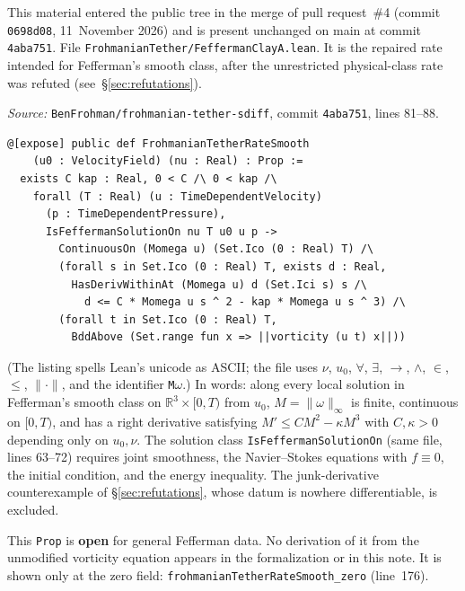 \documentclass[11pt]{article}
\theoremstyle{plain}
\theoremstyle{definition}
\theoremstyle{remark}
\newcommand{\R}{\mathbb{R}}
\begin{document}
This material entered the public tree in the merge of pull request~\#4 (commit \texttt{0698d08}, 11~November 2026) and is present unchanged on main at commit \texttt{4aba751}. File \texttt{FrohmanianTether/\hspace{0pt}FeffermanClayA.\hspace{0pt}lean}. It is the repaired rate intended for Fefferman's smooth class, after the unrestricted physical-class rate was refuted (see~\S\ref{sec:refutations}).

\textit{Source:} \texttt{BenFrohman/\hspace{0pt}frohmanian-tether-sdiff}, commit \texttt{4aba751}, lines 81--88.
\begin{lstlisting}
@[expose] public def FrohmanianTetherRateSmooth
    (u0 : VelocityField) (nu : Real) : Prop :=
  exists C kap : Real, 0 < C /\ 0 < kap /\
    forall (T : Real) (u : TimeDependentVelocity)
      (p : TimeDependentPressure),
      IsFeffermanSolutionOn nu T u0 u p ->
        ContinuousOn (Momega u) (Set.Ico (0 : Real) T) /\
        (forall s in Set.Ico (0 : Real) T, exists d : Real,
          HasDerivWithinAt (Momega u) d (Set.Ici s) s /\
            d <= C * Momega u s ^ 2 - kap * Momega u s ^ 3) /\
        (forall t in Set.Ico (0 : Real) T,
          BddAbove (Set.range fun x => ||vorticity (u t) x||))
\end{lstlisting}
(The listing spells Lean's unicode as ASCII; the file uses \(\nu\), \(u_{0}\), \(\forall\), \(\exists\), \(\to\), \(\wedge\), \(\in\), \(\le\), \(\|\cdot\|\), and the identifier \texttt{M\(\omega\)}.) In words: along every local solution in Fefferman's smooth class on \(\R^{3}\times[0,T)\) from \(u_{0}\), \(M=\|\omega\|_{\infty}\) is finite, continuous on \([0,T)\), and has a right derivative satisfying \(M'\le C M^{2}-\kappa M^{3}\) with \(C,\kappa>0\) depending only on \(u_{0},\nu\). The solution class \texttt{IsFeffermanSolutionOn} (same file, lines 63--72) requires joint smoothness, the Navier--Stokes equations with \(f\equiv 0\), the initial condition, and the energy inequality. The junk-derivative counterexample of \S\ref{sec:refutations}, whose datum is nowhere differentiable, is excluded.

This \texttt{Prop} is \textbf{open} for general Fefferman data. No derivation of it from the unmodified vorticity equation appears in the formalization or in this note. It is shown only at the zero field: \texttt{frohmanianTetherRateSmooth\_\hspace{0pt}zero} (line~176).
\end{document}
